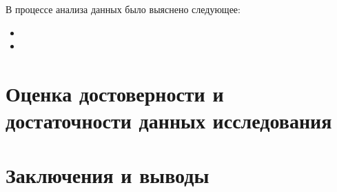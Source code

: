\documentclass{report}
\begin{document}
В процессе анализа данных было выяснено следующее:
\begin{itemize}
\item 
\item
\end{itemize}

\chapter{Оценка достоверности и достаточности данных исследования}

\chapter{Заключения и выводы}



\end{document}
